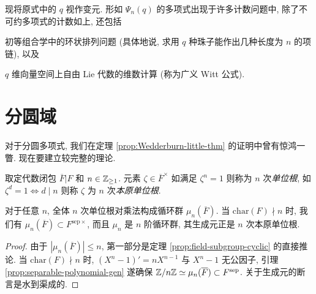 现将原式中的 $q$ 视作变元. 形如 $\Psi_n(q)$ 的多项式出现于许多计数问题中, 除了不可约多项式的计数如上, 还包括
\begin{inparaenum}[(a)]
	\item 初等组合学中的环状排列问题 (具体地说, 求用 $q$ 种珠子能作出几种长度为 $n$ 的项链), 以及
	\item $q$ 维向量空间上自由 Lie 代数的维数计算 (称为广义 Witt 公式).
\end{inparaenum}

\section{分圆域}\label{sec:cyclotomic-ext}
对于分圆多项式, 我们在定理 \ref{prop:Wedderburn-little-thm} 的证明中曾有惊鸿一瞥. 现在要建立较完整的理论.

\begin{definition}
	取定代数闭包 $\overline{F}|F$ 和 $n \in \mathbb{Z}_{\geq 1}$. 元素 $\zeta \in \overline{F}^\times$ 如满足 $\zeta^n = 1$ 则称为 $n$ 次\emph{单位根}, 如 $\zeta^d = 1 \iff d \mid n$ 则称 $\zeta$ 为 $n$ 次\emph{本原单位根}.
\end{definition}

\begin{proposition}
	对于任意 $n$, 全体 $n$ 次单位根对乘法构成循环群 $\mu_n(\overline{F})$. 当 $\mathrm{char}(F) \nmid n$ 时, 我们有 $\mu_n(\overline{F}) \subset F^{\mathrm{sep}\times}$, 而且 $\mu_n$ 是 $n$ 阶循环群, 其生成元正是 $n$ 次本原单位根.
\end{proposition}
\begin{proof}
	由于 $|\mu_n(\overline{F})| \leq n$, 第一部分是定理 \ref{prop:field-subgroup-cyclic} 的直接推论. 当 $\text{char}(F) \nmid n$ 时, $(X^n-1)' = nX^{n-1}$ 与 $X^n-1$ 无公因子, 引理 \ref{prop:separable-polynomial-gen} 遂确保 $\mathbb{Z}/n\mathbb{Z} \simeq \mu_n(\overline{F}) \subset F^\text{sep}$. 关于生成元的断言是水到渠成的.
\end{proof}

